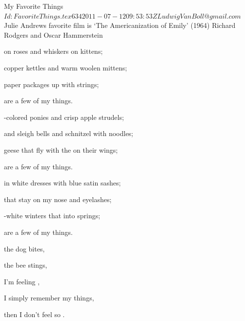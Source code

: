 \begin{SBSong}{My Favorite Things}
  {$Id: FavoriteThings.tex 634 2011-07-12 09:53:53Z LudwigVanBoll@gmail.com $}
  {Julie Andrews favorite film is `The Americanization of Emily' (1964)}
  {Richard Rodgers and Oscar Hammerstein}
  \begin{SBVerse}
     on roses and whiskers on kittens;

     copper kettles and warm woolen mittens;

     paper packages  up with strings;

     are a few of my  things.
  \end{SBVerse}
  \begin{SBVerse}
    -colored ponies and crisp apple strudels;

     and sleigh bells and schnitzel with noodles;

     geese that fly with the  on their wings;

     are a few of my  things.
  \end{SBVerse}
  \begin{SBVerse}
     in white dresses with blue satin sashes;

     that stay on my nose and eyelashes;

    -white winters that  into springs;

     are a few of my  things.
  \end{SBVerse}
  \begin{SBVerse}
     the dog bites,

     the bee stings,

     I'm feeling ,

    I simply remember my  things,

     then I don't feel so .
  \end{SBVerse}
\end{SBSong}
